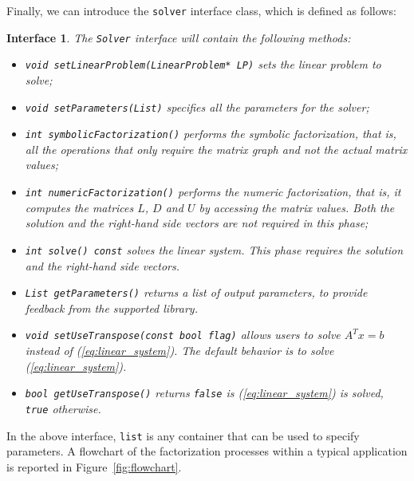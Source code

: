 \documentclass[acmtoms,acmnow]{acmtrans2m}
\newtheorem{interface}{Interface}[section]
\begin{document}
Finally, we can introduce the {\tt solver} interface class, which is defined as
follows:
\begin{interface}
\label{int:asi}
The {\tt Solver} interface
will contain the following methods:
\begin{itemize}
\item \verb!void setLinearProblem(LinearProblem* LP)! sets the linear problem
to solve;
\item \verb!void setParameters(List)! specifies all the parameters for the solver;
\item \verb!int symbolicFactorization()! performs the symbolic factorization, that
is, all the operations that only require the matrix graph and not
the actual matrix values;
\item \verb!int numericFactorization()! performs the numeric factorization, that
is, it computes the matrices $L$, $D$ and $U$ by accessing the matrix values.
Both the solution and the right-hand side vectors are not required in this phase;
\item \verb!int solve() const! solves the linear system. This phase requires the
solution and the right-hand side vectors.
\item \verb!List getParameters()! returns a list of output parameters, to
provide feedback from the supported library.
\item \verb!void setUseTranspose(const bool flag)! allows users to solve $A^T x =
b$ instead of (\ref{eq:linear_system}). The default behavior is to solve
(\ref{eq:linear_system}).
\item \verb!bool getUseTranspose()! returns \verb!false! is
(\ref{eq:linear_system}) is solved, \verb!true! otherwise.
\end{itemize}
\end{interface}
In the above interface, {\tt list} is any container that can be used
to specify parameters. A flowchart of the factorization processes
within a typical application is reported in
Figure~\ref{fig:flowchart}.
\end{document}
